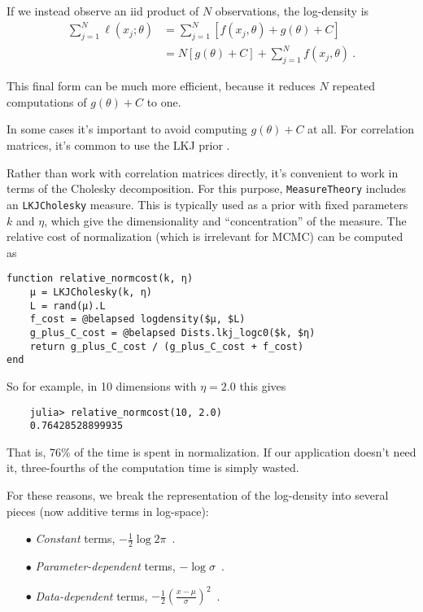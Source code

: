 \documentclass{juliacon}
\begin{document}
If we instead observe an iid product of $N$ observations, the log-density is
\[
\begin{aligned}
\sum_{j=1}^N\ell(x_j; \theta) 
    &= \sum_{j=1}^N \left[ f(x_j,\theta) + g(\theta) + C\right] \\
    &= N [g(\theta) + C] + \sum_{j=1}^N  f(x_j,\theta)\ .
\end{aligned}
\]

This final form can be much more efficient, because it reduces $N$ repeated computations of $g(\theta) + C$ to one. 

In some cases it's important to avoid computing $g(\theta) + C$ at all. For correlation matrices, it's common to use the LKJ prior \cite{LEWANDOWSKI20091989}. 

Rather than work with correlation matrices directly, it's convenient to work in terms of the Cholesky decomposition. For this purpose, \verb|MeasureTheory| includes an \verb|LKJCholesky| measure. This is typically used as a prior with fixed parameters $k$ and $\eta$, which give the dimensionality and ``concentration'' of the measure. The relative cost of normalization (which is irrelevant for MCMC) can be computed as

\begin{verbatim}
function relative_normcost(k, η)
    μ = LKJCholesky(k, η)
    L = rand(μ).L
    f_cost = @belapsed logdensity($μ, $L)
    g_plus_C_cost = @belapsed Dists.lkj_logc0($k, $η)
    return g_plus_C_cost / (g_plus_C_cost + f_cost)
end
\end{verbatim}

So for example, in 10 dimensions with $\eta=2.0$ this gives
\begin{verbatim}
    julia> relative_normcost(10, 2.0)
    0.76428528899935    
\end{verbatim}

That is, 76\% of the time is spent in normalization. If our application doesn't need it, three-fourths of the computation time is simply wasted.

For these reasons, we break the representation of the log-density into several pieces (now additive terms in log-space):
\begin{enumerate}
    \item[$\bullet\!$]\emph{Constant} terms,  $-\frac{1}{2}\log 2\pi$\ .
    \item[$\bullet\!$]\emph{Parameter-dependent} terms,  $-\log \sigma$\ .
    \item[$\bullet\!$]\emph{Data-dependent} terms, $-\frac{1}{2}\left(\frac{x - \mu}{\sigma}\right)^2$\ .
\end{enumerate}
\end{document}
